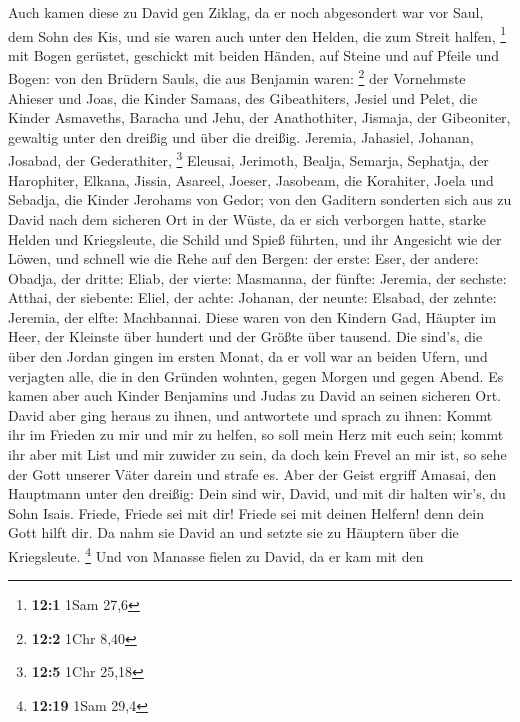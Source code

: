  Auch kamen diese zu David gen Ziklag, da er noch
abgesondert war vor Saul, dem Sohn des Kis, und sie waren auch unter den
Helden, die zum Streit halfen, \footnote{\textbf{12:1} 1Sam 27,6}
 mit Bogen gerüstet, geschickt mit beiden Händen, auf
Steine und auf Pfeile und Bogen: von den Brüdern Sauls, die aus Benjamin
waren: \footnote{\textbf{12:2} 1Chr 8,40}  der Vornehmste
Ahieser und Joas, die Kinder Samaas, des Gibeathiters, Jesiel und Pelet,
die Kinder Asmaveths, Baracha und Jehu, der Anathothiter, 
Jismaja, der Gibeoniter, gewaltig unter den dreißig und über die
dreißig.  Jeremia, Jahasiel, Johanan, Josabad, der
Gederathiter, \footnote{\textbf{12:5} 1Chr 25,18} 
Eleusai, Jerimoth, Bealja, Semarja, Sephatja, der Harophiter,
 Elkana, Jissia, Asareel, Joeser, Jasobeam, die Korahiter,
 Joela und Sebadja, die Kinder Jerohams von Gedor;
 von den Gaditern sonderten sich aus zu David nach dem
sicheren Ort in der Wüste, da er sich verborgen hatte, starke Helden und
Kriegsleute, die Schild und Spieß führten, und ihr Angesicht wie der
Löwen, und schnell wie die Rehe auf den Bergen:  der
erste: Eser, der andere: Obadja, der dritte: Eliab,  der
vierte: Masmanna, der fünfte: Jeremia,  der sechste:
Atthai, der siebente: Eliel,  der achte: Johanan, der
neunte: Elsabad,  der zehnte: Jeremia, der elfte:
Machbannai.  Diese waren von den Kindern Gad, Häupter im
Heer, der Kleinste über hundert und der Größte über tausend.
 Die sind's, die über den Jordan gingen im ersten Monat,
da er voll war an beiden Ufern, und verjagten alle, die in den Gründen
wohnten, gegen Morgen und gegen Abend.  Es kamen aber
auch Kinder Benjamins und Judas zu David an seinen sicheren Ort.
 David aber ging heraus zu ihnen, und antwortete und
sprach zu ihnen: Kommt ihr im Frieden zu mir und mir zu helfen, so soll
mein Herz mit euch sein; kommt ihr aber mit List und mir zuwider zu
sein, da doch kein Frevel an mir ist, so sehe der Gott unserer Väter
darein und strafe es.  Aber der Geist ergriff Amasai, den
Hauptmann unter den dreißig: Dein sind wir, David, und mit dir halten
wir's, du Sohn Isais. Friede, Friede sei mit dir! Friede sei mit deinen
Helfern! denn dein Gott hilft dir. Da nahm sie David an und setzte sie
zu Häuptern über die Kriegsleute. \footnote{\textbf{12:19} 1Sam 29,4}
 Und von Manasse fielen zu David, da er kam mit den
